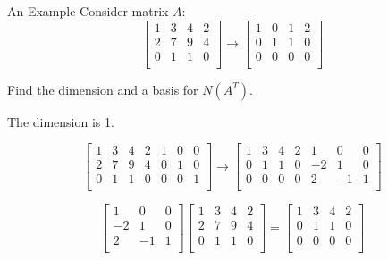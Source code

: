 \documentclass{beamer}
\begin{document}
\begin{frame}{An Example}
Consider matrix $A$:
\begin{equation*}
    \left[ \begin{matrix}
        1&		3&		4&		2\\
        2&		7&		9&		4\\
        0&		1&		1&		0\\
    \end{matrix} \right] \rightarrow \left[ \begin{matrix}
        1&		0&		1&		2\\
        0&		1&		1&		0\\
        0&		0&		0&		0\\
    \end{matrix} \right]
\end{equation*}

Find the dimension and a basis for $N(A^T)$.

\vspace{3pt}
The dimension is 1.

\begin{equation*}
    \left[ \begin{matrix}
        1&		3&		4&		2&		1&		0&		0\\
        2&		7&		9&		4&		0&		1&		0\\
        0&		1&		1&		0&		0&		0&		1\\
    \end{matrix} \right] \rightarrow \left[ \begin{matrix}
        1&		3&		4&		2&		1&		0&		0\\
        0&		1&		1&		0&		-2&		1&		0\\
        0&		0&		0&		0&		2&		-1&		1\\
    \end{matrix} \right]
\end{equation*}

\begin{equation*}
    \left[ \begin{matrix}
        1&		0&		0\\
        -2&		1&		0\\
        2&		-1&		1\\
    \end{matrix} \right] \left[ \begin{matrix}
        1&		3&		4&		2\\
        2&		7&		9&		4\\
        0&		1&		1&		0\\
    \end{matrix} \right] =\left[ \begin{matrix}
        1&		3&		4&		2\\
        0&		1&		1&		0\\
        0&		0&		0&		0\\
    \end{matrix} \right]
\end{equation*}


\end{frame}
\end{document}

